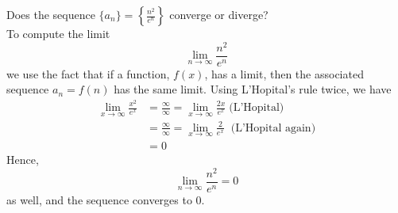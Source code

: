 \documentclass[handout]{ximera}
\begin{document}
\begin{example}
Does the sequence $\displaystyle \{a_n\} = \left\{\frac{n^2}{e^n}\right\}$ converge or diverge?\\
To compute the limit
\[
\lim_{n \to \infty} \frac{n^2}{e^n}
\]
we use the fact that if a function, $f(x)$, has a limit, then the associated sequence
$a_n = f(n)$ has the same limit. Using L'Hopital's rule twice, we have
\begin{align*}
\lim_{x \to \infty} \frac{x^2}{e^x} &= \frac{\infty}{\infty} = \lim_{x \to \infty} \frac{2x}{e^x} \;\text{(L'Hopital)}\\
                                  &=\frac{\infty}{\infty} = \lim_{x \to \infty} \frac{2}{e^x} \;\;\text{(L'Hopital again)}\\
                                  &=0
\end{align*}
Hence, 
\[
\lim_{n \to \infty} \frac{n^2}{e^n} =0
\]
as well, and the sequence converges to $0$. 
\end{example}
\end{document}
